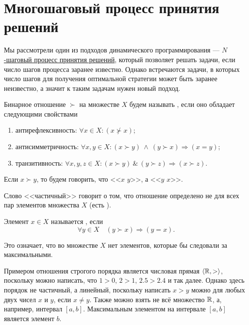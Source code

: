 \section{Многошаговый процесс принятия решений}

Мы рассмотрели один из подходов динамического программирования --- \hyperref[alg:n_step_process]{$N$-шаговый процесс принятия решений}, который позволяет решать задачи, если число шагов процесса заранее известно. Однако встречаются задачи, в которых число шагов для получения оптимальной стратегии может быть заранее неизвестно, а значит к таким задачам нужен новый подход.


Бинарное отношение $\succ$ на множестве $X$ будем называть , если оно обладает следующими свойствами

\begin{enumerate}[nosep]
	\item антирефлексивность: $\forall x \in X: (x \nsucc x)$;
		
	\item антисимметричность: $\forall x, y \in X: (x \succ y) \ \land \ (y \succ x) \Rightarrow (x = y)$;
	
	\item транзитивность: $\forall x, y, z \in X: (x \succ y) \ \& \ (y \succ z) \Rightarrow (x \succ z)$.
\end{enumerate}

Если $x \succ y$, то будем говорить, что <<$x$  $y$>>, а <<$y$  $x$>>.

\remark

Слово <<частичный>> говорит о том, что отношение определено не для всех пар элементов множества $X$ (есть ).


Элемент $x \in X$ называется , если
\[
\forall y \in X \quad (y \succ x) \Rightarrow (y=x).
\]

Это означает, что во множестве $X$ нет элементов, которые бы следовали за максимальными.

\example

Примером отношения строгого порядка является числовая прямая $\langle\mathbb{R}, >\rangle$, поскольку можно написать, что $1 > 0$, $2 > 1$, $2.5 > 2.4$ и так далее. Однако здесь порядок не частичный, а линейный, поскольку написать $x > y$ можно для любых двух чисел $x$ и $y$, если $x \neq y$. Также можно взять не всё множество $\mathbb{R}$, а, например, интервал $[a, b]$. Максимальным элементом на интервале $[a, b]$ является элемент $b$.

